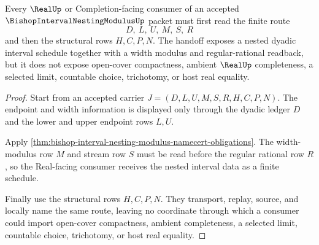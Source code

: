 \begin{theorem}
\label{thm:bishop-interval-nesting-modulus-real-handoff}
Every $\RealUp$ or Completion-facing consumer of an accepted $\BishopIntervalNestingModulusUp$ packet must first read the finite route
$$
D,\ L,\ U,\ M,\ S,\ R
$$
and then the structural rows $H,C,P,N$. The handoff exposes a nested dyadic interval schedule together with a width modulus and regular-rational readback, but it does not expose open-cover compactness, ambient $\RealUp$ completeness, a selected limit, countable choice, trichotomy, or host real equality.
\end{theorem}
\begin{proof}
Start from an accepted carrier $J=(D,L,U,M,S,R,H,C,P,N)$. The endpoint and width information is displayed only through the dyadic ledger $D$ and the lower and upper endpoint rows $L,U$.

Apply \autoref{thm:bishop-interval-nesting-modulus-namecert-obligations}. The width-modulus row $M$ and stream row $S$ must be read before the regular rational row $R$, so the Real-facing consumer receives the nested interval data as a finite schedule.

Finally use the structural rows $H,C,P,N$. They transport, replay, source, and locally name the same route, leaving no coordinate through which a consumer could import open-cover compactness, ambient completeness, a selected limit, countable choice, trichotomy, or host real equality.
\end{proof}


\begin{closurestatus}{\BishopIntervalNestingModulusUp}
  \theoryclosure{\seedClosure}
  \formalstatus{\unformalizedV}
\end{closurestatus}
